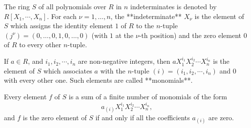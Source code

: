 The ring $S$ of all polynomials over $R$ in $n$ indeterminates is denoted by $R[X_1, \cdots, X_n]$. For each $\nu = 1, \dots, n$, the **indeterminate** $X_\nu$ is the element of $S$ which assigns the identity element $1$ of $R$ to the $n$-tuple $(j^\nu) = (0, \dots, 0, 1, 0, \dots, 0)$ (with $1$ at the $\nu$-th position) and the zero element $0$ of $R$ to every other $n$-tuple.

If $a \in R$, and $i_1, i_2, \cdots, i_n$ are non-negative integers, then $aX_1^{i_1}X_2^{i_2} \cdots X_n^{i_n}$ is the element of $S$ which associates $a$ with the $n$-tuple $(i) = (i_1, i_2, \cdots, i_n)$ and $0$ with every other one. Such elements are called **monomials**.

Every element $f$ of $S$ is a sum of a finite number of monomials of the form
$$a_{(i)}X_1^{i_1}X_2^{i_2} \cdots X_n^{i_n},$$
and $f$ is the zero element of $S$ if and only if all the coefficients $a_{(i)}$ are zero.

